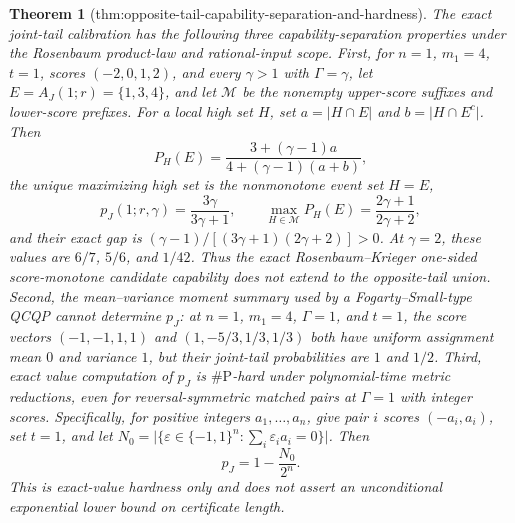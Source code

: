 \documentclass{article}
\newtheorem{theorem}{Theorem}
\begin{document}
\begin{theorem}[thm:opposite-tail-capability-separation-and-hardness]\label{thm:opposite-tail-capability-separation-and-hardness}
The exact joint-tail calibration has the following three capability-separation properties under the Rosenbaum product-law and rational-input scope. First, for \(n=1\), \(m_1=4\), \(t=1\), scores \((-2,0,1,2)\), and every \(\gamma>1\) with \(\Gamma=\gamma\), let \(E=A_J(1;r)=\{1,3,4\}\), and let \(\mathcal M\) be the nonempty upper-score suffixes and lower-score prefixes. For a local high set \(H\), set \(a=\lvert H\cap E\rvert\) and \(b=\lvert H\cap E^c\rvert\). Then \[ P_H(E)=\frac{3+(\gamma-1)a}{4+(\gamma-1)(a+b)}, \] the unique maximizing high set is the nonmonotone event set \(H=E\), \[ p_J(1;r,\gamma)=\frac{3\gamma}{3\gamma+1},\qquad \max_{H\in\mathcal M}P_H(E)=\frac{2\gamma+1}{2\gamma+2}, \] and their exact gap is \( (\gamma-1)/[(3\gamma+1)(2\gamma+2)]>0\). At \(\gamma=2\), these values are \(6/7\), \(5/6\), and \(1/42\). Thus the exact Rosenbaum--Krieger one-sided score-monotone candidate capability does not extend to the opposite-tail union. Second, the mean--variance moment summary used by a Fogarty--Small-type QCQP cannot determine \(p_J\): at \(n=1\), \(m_1=4\), \(\Gamma=1\), and \(t=1\), the score vectors \((-1,-1,1,1)\) and \((1,-5/3,1/3,1/3)\) both have uniform assignment mean \(0\) and variance \(1\), but their joint-tail probabilities are \(1\) and \(1/2\). Third, exact value computation of \(p_J\) is \(\#\mathrm P\)-hard under polynomial-time metric reductions, even for reversal-symmetric matched pairs at \(\Gamma=1\) with integer scores. Specifically, for positive integers \(a_1,\ldots,a_n\), give pair \(i\) scores \((-a_i,a_i)\), set \(t=1\), and let \(N_0=\lvert\{\varepsilon\in\{-1,1\}^n:\sum_i\varepsilon_i a_i=0\}\rvert\). Then \[ p_J=1-\frac{N_0}{2^n}. \] This is exact-value hardness only and does not assert an unconditional exponential lower bound on certificate length.
\end{theorem}
\end{document}
